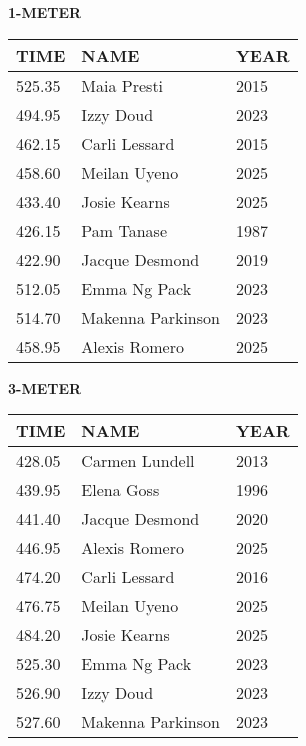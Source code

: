 \begin{center}
\begin{minipage}[t]{0.7\textwidth}
\centering
\textbf{1-METER}\\[0.05cm]
\begin{tabular}{@{}p{1.8cm}p{2.8cm}p{1.2cm}@{}}
\hline
\textbf{TIME} & \textbf{NAME} & \textbf{YEAR} \\
\hline
525.35 & Maia Presti & 2015 \\
494.95 & Izzy Doud & 2023 \\
462.15 & Carli Lessard & 2015 \\
458.60 & Meilan Uyeno & 2025 \\
433.40 & Josie Kearns & 2025 \\
426.15 & Pam Tanase & 1987 \\
422.90 & Jacque Desmond & 2019 \\
512.05 & Emma Ng Pack & 2023 \\
514.70 & Makenna Parkinson & 2023 \\
458.95 & Alexis Romero & 2025 \\
\hline
\end{tabular}
\end{minipage}
\end{center}

\vspace{0.4cm}

\begin{center}
\begin{minipage}[t]{0.7\textwidth}
\centering
\textbf{3-METER}\\[0.05cm]
\begin{tabular}{@{}p{1.8cm}p{2.8cm}p{1.2cm}@{}}
\hline
\textbf{TIME} & \textbf{NAME} & \textbf{YEAR} \\
\hline
428.05 & Carmen Lundell & 2013 \\
439.95 & Elena Goss & 1996 \\
441.40 & Jacque Desmond & 2020 \\
446.95 & Alexis Romero & 2025 \\
474.20 & Carli Lessard & 2016 \\
476.75 & Meilan Uyeno & 2025 \\
484.20 & Josie Kearns & 2025 \\
525.30 & Emma Ng Pack & 2023 \\
526.90 & Izzy Doud & 2023 \\
527.60 & Makenna Parkinson & 2023 \\
\hline
\end{tabular}
\end{minipage}
\end{center}

